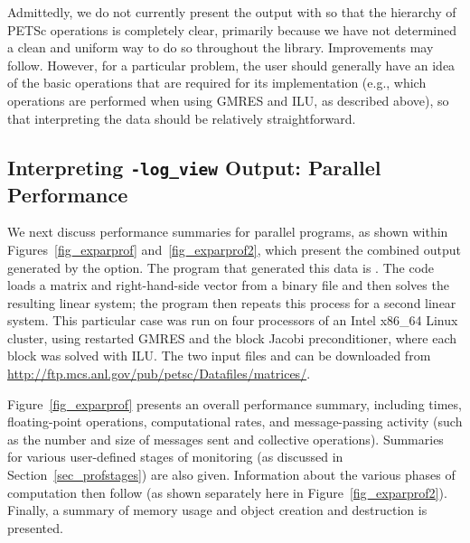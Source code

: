 Admittedly, we do not currently present the output with
 so that the hierarchy of PETSc operations is completely
clear, primarily because we have not determined a clean and uniform
way to do so throughout the library.  Improvements may follow.
However, for a particular problem, the user should generally have
an idea of the basic operations that are required for its
implementation (e.g., which operations are performed when using GMRES
and ILU, as described above), so that interpreting the 
data should be relatively straightforward.

\subsection{Interpreting {\tt -log\_view} Output: Parallel Performance}
\label{sec_parperformance}

We next discuss performance summaries for parallel programs,
 as shown within Figures~\ref{fig_exparprof}
and~\ref{fig_exparprof2}, which present the combined output generated by
the  option.  The program that generated this data is
\href{https://www.mcs.anl.gov/petsc/petsc-current/src/ksp/ksp/tutorials/ex10.c.html}{}.
The code loads a
matrix and right-hand-side vector from a binary file and then solves
the resulting linear system; the program then repeats this process for
a second linear system.  This particular case was run on four
processors of an Intel x86\_64 Linux cluster, using restarted GMRES and the block Jacobi
preconditioner, where each block was solved with ILU. The two input files
\href{http://ftp.mcs.anl.gov/pub/petsc/Datafiles/matrices/medium}{} and
\href{http://ftp.mcs.anl.gov/pub/petsc/Datafiles/matrices/arco6}{} can be downloaded from \url{http://ftp.mcs.anl.gov/pub/petsc/Datafiles/matrices/}.

Figure~\ref{fig_exparprof} presents an overall performance summary,
including times, floating-point operations, computational rates, and
message-passing activity (such as the number and size of messages sent
and collective operations).  Summaries for various user-defined stages
of monitoring (as discussed in Section~\ref{sec_profstages}) are also
given. Information about the various phases of computation then follow
(as shown separately here in Figure~\ref{fig_exparprof2}).
Finally, a summary of memory usage and object creation and destruction
is presented.

